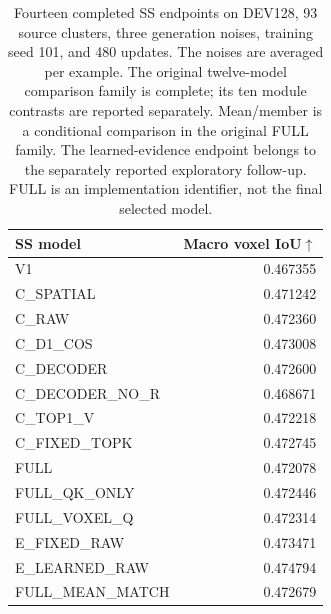 \begin{table}[t]
\centering\small
\begin{tabular}{lr}
\toprule
SS model&Macro voxel IoU$\uparrow$\\
\midrule
V1&0.467355\\
C\_SPATIAL&0.471242\\
C\_RAW&0.472360\\
C\_D1\_COS&0.473008\\
C\_DECODER&0.472600\\
C\_DECODER\_NO\_R&0.468671\\
C\_TOP1\_V&0.472218\\
C\_FIXED\_TOPK&0.472745\\
FULL&0.472078\\
FULL\_QK\_ONLY&0.472446\\
FULL\_VOXEL\_Q&0.472314\\
E\_FIXED\_RAW&0.473471\\
E\_LEARNED\_RAW&0.474794\\
FULL\_MEAN\_MATCH&0.472679\\
\bottomrule
\end{tabular}
\caption{Fourteen completed SS endpoints on DEV128, 93 source clusters, three generation noises, training seed 101, and 480 updates. The noises are averaged per example. The original twelve-model comparison family is complete; its ten module contrasts are reported separately. Mean/member is a conditional comparison in the original FULL family. The learned-evidence endpoint belongs to the separately reported exploratory follow-up. FULL is an implementation identifier, not the final selected model.}
\label{tab:dev-ss128}
\end{table}
